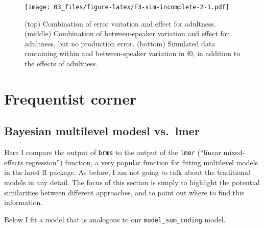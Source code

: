\documentclass[
]{book}
\begin{document}
\begin{figure}
\centering
\texttt{[image: 03\_files/figure-latex/F3-sim-incomplete-2-1.pdf]}
\caption{\label{fig:F3-sim-incomplete-2}(top) Combination of error variation and effect for adultness. (middle) Combination of between-speaker variation and effect for adultness, but no production error. (bottom) Simulated data containing within and between-speaker variation in f0, in addition to the effects of adultness.}
\end{figure}

\hypertarget{frequentist-corner-1}{%
\section{Frequentist corner}\label{frequentist-corner-1}}

\hypertarget{bayesian-multilevel-modesl-vs.-lmer-1}{%
\subsection{Bayesian multilevel modesl vs.~lmer}\label{bayesian-multilevel-modesl-vs.-lmer-1}}

Here I compare the output of \texttt{brms} to the output of the \texttt{lmer} (``linear mixed-effects regression'') function, a very popular function for fitting multilevel models in the lme4 R package. As before, I am not going to talk about the traditional models in any detail. The focus of this section is simply to highlight the potential similarities between different approaches, and to point out where to find this information.

Below I fit a model that is analogous to our \texttt{model\_sum\_coding} model.
\end{document}

